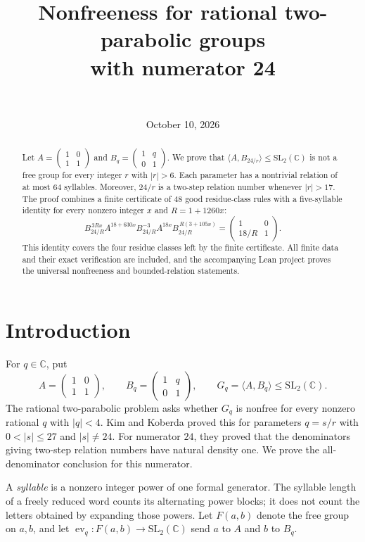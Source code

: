 \documentclass[11pt]{article}
\title{Nonfreeness for rational two-parabolic groups\protect\\with numerator 24}
\author{\AuthorName\ifx\AuthorAffiliation\empty\else\\\small\AuthorAffiliation\fi}
\date{October 10, 2026}
\theoremstyle{definition}
\theoremstyle{remark}
\numberwithin{equation}{section}
\newcommand{\C}{\mathbb C}
\newcommand{\SL}{\mathrm{SL}}
\newcommand{\F}{F(a,b)}
\newcommand{\low}[1]{\begin{pmatrix}1&0\\#1&1\end{pmatrix}}
\newcommand{\up}[1]{\begin{pmatrix}1&#1\\0&1\end{pmatrix}}
\newcommand{\ev}{\operatorname{ev}}
\begin{document}
\maketitle
\begin{abstract}
Let $A=\left(\begin{smallmatrix}1&0\\1&1\end{smallmatrix}\right)$ and
$B_q=\left(\begin{smallmatrix}1&q\\0&1\end{smallmatrix}\right)$.
We prove that $\langle A,B_{24/r}\rangle\leq\SL_2(\C)$ is not a free group
for every integer $r$ with $|r|>6$. Each parameter has a nontrivial
relation of at most $64$ syllables. Moreover, $24/r$ is a two-step
relation number whenever $|r|>17$. The proof combines a finite
certificate of $48$ good residue-class rules with a five-syllable
identity for every nonzero integer $x$ and $R=1+1260x$:
\[
 B_{24/R}^{\,3Rx} A^{18+630x} B_{24/R}^{-3}
 A^{18x}B_{24/R}^{\,R(3+105x)}
 =\begin{pmatrix}1&0\\18/R&1\end{pmatrix}.
\]
This identity covers the four residue classes left by the finite
certificate. All finite data and their exact verification are included,
and the accompanying Lean project proves the universal nonfreeness
and bounded-relation statements.
\end{abstract}

\section{Introduction}
For $q\in\C$, put
\begin{equation}\label{eq:generators}
 A=\low{1},\qquad B_q=\up{q},\qquad
 G_q=\langle A,B_q\rangle\leq\SL_2(\C).
\end{equation}
The rational two-parabolic problem asks whether $G_q$ is nonfree for
every nonzero rational $q$ with $|q|<4$. Kim and Koberda
\cite[Theorem~1.4]{KK2020} proved this for parameters $q=s/r$ with
$0<|s|\leq27$ and $|s|\ne24$. For numerator $24$, they proved that
the denominators giving two-step relation numbers have natural density
one. We prove the all-denominator conclusion for this numerator.

A \emph{syllable} is a nonzero integer power of one formal generator.
The syllable length of a freely reduced word counts its alternating
power blocks; it does not count the letters obtained by expanding
those powers. Let $\F$ denote the free group on $a,b$, and let
$\ev_q:\F\to\SL_2(\C)$ send $a$ to $A$ and $b$ to $B_q$.
\end{document}
